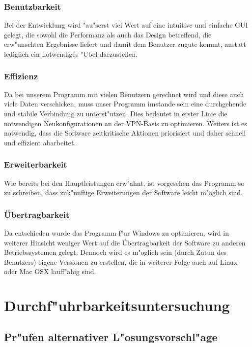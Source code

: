 \documentclass[a4paper,12pt]{scrreprt}
\begin{document}
	\subsection{Benutzbarkeit}
	Bei der Entwicklung wird "au"serst viel Wert auf eine intuitive und einfache GUI gelegt, die sowohl die Performanz als auch das Design betreffend, die erw"unschten Ergebnisse liefert und damit dem Benutzer zugute kommt, anstatt lediglich ein notwendiges "Ubel darzustellen. 
			
	\subsection{Effizienz}
	Da bei unserem Programm  mit vielen Benutzern gerechnet wird und diese auch viele Daten verschicken, muss unser Programm imstande sein eine durchgehende und stabile Verbindung zu unterst"utzen. Dies bedeutet in erster Linie die notwendigen Neukonfigurationen an der VPN-Basis zu optimieren. Weiters ist es notwendig, dass die Software zeitkritische Aktionen priorisiert und daher schnell und effizient abarbeitet.
		
		
	\subsection{Erweiterbarkeit}
	Wie bereits bei den Hauptleistungen erw"ahnt, ist vorgesehen das Programm so zu schreiben, dass zuk"unftige Erweiterungen der Software leicht m"oglich sind. 
		
	\subsection{Übertragbarkeit}
	Da entschieden wurde das Programm f"ur Windows zu optimieren, wird in weiterer Hinsicht weniger Wert auf die Übertragbarkeit der Software zu anderen Betriebssystemen gelegt. Dennoch wird es m"oglich sein (durch Zutun des Benutzers) eigene Versionen zu erstellen, die in weiterer Folge auch auf Linux oder Mac OSX lauff"ahig sind.
			
			
\chapter{Durchf"uhrbarkeitsuntersuchung}
	
	\section{Pr"ufen alternativer L"osungsvorschl"age}
	
\end{document}
